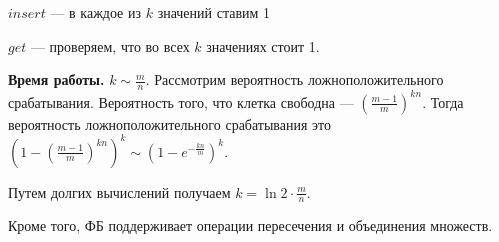 \documentclass[12pt]{article}
\begin{document}
$insert$ --- в каждое из $k$ значений ставим 1

$get$ --- проверяем, что во всех $k$ значениях стоит 1.

\textbf{Время работы.} $k \sim \frac{m}{n}$. Рассмотрим вероятность ложноположительного срабатывания. Вероятность того, что клетка свободна --- $(\frac{m-1}{m})^{kn}$. Тогда вероятность ложноположительного срабатывания это $(1 -(\frac{m-1}{m})^{kn})^k \sim (1 - e^{-\frac{kn}{m}})^k$.

Путем долгих вычислений получаем $k = \ln 2 \cdot \frac{m}{n}$.

Кроме того, ФБ поддерживает операции пересечения и объединения множеств.
\end{document}

